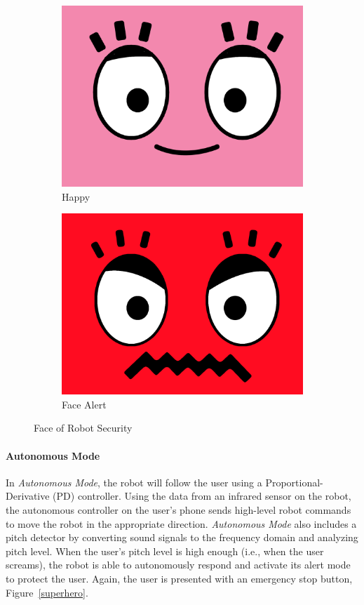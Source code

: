\documentclass[12pt]{article}
\begin{document}
\begin{figure}[!htbp]
\begin{subfigure}[b]{0.45\textwidth}
    \includegraphics[width=\textwidth]{2.png}
    \caption{Happy}
    \label{happy}
    \end{subfigure}
    \begin{subfigure}[b]{0.45\textwidth}
    \centering
    \includegraphics[width=\textwidth]{10.png}
    \caption{Face Alert}
    \label{facealert}
    \end{subfigure}
    \caption{Face of Robot Security}
    \label{facerobot}
\end{figure}

\paragraph{Autonomous Mode}
In \textit{Autonomous Mode}, the robot will follow the user using a Proportional-Derivative (PD) controller. Using the data from an infrared sensor on the robot, the autonomous controller on the user's phone sends high-level robot commands to move the robot in the appropriate direction. \textit{Autonomous Mode} also includes a pitch detector by converting sound signals to the frequency domain and analyzing pitch level. When the user's pitch level is high enough (i.e., when the user screams), the robot is able to autonomously respond and activate its alert mode to protect the user. Again, the user is presented with an emergency stop button, Figure~\ref{superhero}.
\end{document}
